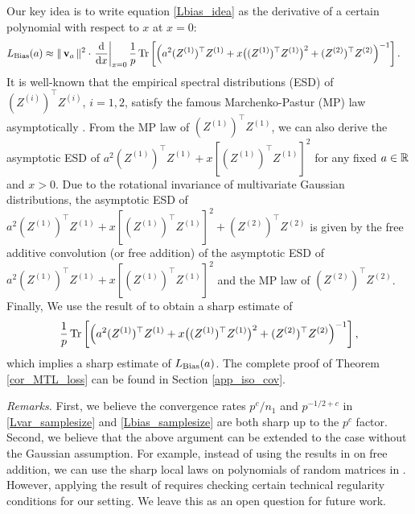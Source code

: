 Our key idea is to write equation \eqref{Lbias_idea} as the derivative of a certain polynomial with respect to $x$ at $x = 0$:
\begin{align}\nonumber %
L_{\bias} (a)&\approx \|\bv_a\|^2 \cdot\left. \frac{\dd }{\dd x}\right|_{x=0}\frac1p\bigtr{  \Big( a^2(Z^{(1)})^\top Z^{(1)} + x \big((Z^{(1)})^\top Z^{(1)}\big)^2 + (Z^{(2)})^\top Z^{(2)} \Big)^{-1}  }.
\end{align}
It is well-known that the empirical spectral distributions (ESD) of $(Z^{(i)})^\top Z^{(i)}$, $i=1,2$, satisfy the famous Marchenko-Pastur (MP) law asymptotically \cite{MP}. From the MP law of $(Z^{(1)})^\top Z^{(1)}$, we can also derive the asymptotic ESD of $a^2(Z^{(1)})^\top Z^{(1)}+ x[(Z^{(1)})^\top Z^{(1)}]^2$ for any fixed $a\in \mathbb{R}$ and $x>0$. Due to the rotational invariance of multivariate Gaussian distributions,
the asymptotic ESD of $a^2(Z^{(1)})^\top Z^{(1)}+ x[(Z^{(1)})^\top Z^{(1)}]^2+(Z^{(2)})^\top Z^{(2)}$ is given by the free additive convolution (or free addition) of the asymptotic ESD of $a^2(Z^{(1)})^\top Z^{(1)}+ x[(Z^{(1)})^\top Z^{(1)}]^2$ and the MP law of $(Z^{(2)})^\top Z^{(2)}$\cite{nica2006lectures}.
Finally, We use the result of \citet{BES_free1,BES_free2} to obtain a sharp estimate of
$$\frac1p\operatorname{Tr}\left[  \Big( a^2(Z^{(1)})^\top Z^{(1)}+ x \big((Z^{(1)})^\top Z^{(1)}\big)^2+(Z^{(2)})^\top Z^{(2)} \Big)^{-1}\right],$$
which implies a sharp estimate of $L_{\textup{Bias}}(a)$.
The complete proof of Theorem \ref{cor_MTL_loss} can be found in Section \ref{app_iso_cov}.

\medskip
\noindent\textit{Remarks.}
First, we believe the convergence rates $p^c/n_1$ and $p^{-1/2+c}$ in \eqref{Lvar_samplesize} and \eqref{Lbias_samplesize} are both sharp up to the $p^c$ factor.
Second, we believe that the above argument can be extended to the case without the Gaussian assumption. For example, instead of using the results in \cite{BES_free1,BES_free2} on free addition, we can use the sharp local laws on polynomials of random matrices in \cite{EKN_poly}. However, applying the result of \citet{EKN_poly} requires checking certain technical regularity conditions for our setting. We leave this as an open question for future work.

